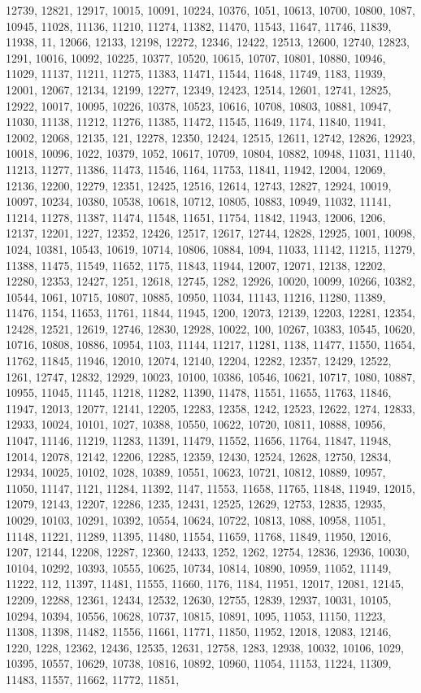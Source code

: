 \documentclass{article} \usepackage{hyperref}
\begin{document}
12739, 12821, 12917, 10015, 10091, 10224, 10376, 1051, 10613, 10700, 10800, 1087, 10945, 11028, 11136, 11210, 11274, 11382, 11470, 11543, 11647, 11746, 11839, 11938, 11, 12066, 12133, 12198, 12272, 12346, 12422, 12513, 12600, 12740, 12823, 1291, 10016, 10092, 10225, 10377, 10520, 10615, 10707, 10801, 10880, 10946, 11029, 11137, 11211, 11275, 11383, 11471, 11544, 11648, 11749, 1183, 11939, 12001, 12067, 12134, 12199, 12277, 12349, 12423, 12514, 12601, 12741, 12825, 12922, 10017, 10095, 10226, 10378, 10523, 10616, 10708, 10803, 10881, 10947, 11030, 11138, 11212, 11276, 11385, 11472, 11545, 11649, 1174, 11840, 11941, 12002, 12068, 12135, 121, 12278, 12350, 12424, 12515, 12611, 12742, 12826, 12923, 10018, 10096, 1022, 10379, 1052, 10617, 10709, 10804, 10882, 10948, 11031, 11140, 11213, 11277, 11386, 11473, 11546, 1164, 11753, 11841, 11942, 12004, 12069, 12136, 12200, 12279, 12351, 12425, 12516, 12614, 12743, 12827, 12924, 10019, 10097, 10234, 10380, 10538, 10618, 10712, 10805, 10883, 10949, 11032, 11141, 11214, 11278, 11387, 11474, 11548, 11651, 11754, 11842, 11943, 12006, 1206, 12137, 12201, 1227, 12352, 12426, 12517, 12617, 12744, 12828, 12925, 1001, 10098, 1024, 10381, 10543, 10619, 10714, 10806, 10884, 1094, 11033, 11142, 11215, 11279, 11388, 11475, 11549, 11652, 1175, 11843, 11944, 12007, 12071, 12138, 12202, 12280, 12353, 12427, 1251, 12618, 12745, 1282, 12926, 10020, 10099, 10266, 10382, 10544, 1061, 10715, 10807, 10885, 10950, 11034, 11143, 11216, 11280, 11389, 11476, 1154, 11653, 11761, 11844, 11945, 1200, 12073, 12139, 12203, 12281, 12354, 12428, 12521, 12619, 12746, 12830, 12928, 10022, 100, 10267, 10383, 10545, 10620, 10716, 10808, 10886, 10954, 1103, 11144, 11217, 11281, 1138, 11477, 11550, 11654, 11762, 11845, 11946, 12010, 12074, 12140, 12204, 12282, 12357, 12429, 12522, 1261, 12747, 12832, 12929, 10023, 10100, 10386, 10546, 10621, 10717, 1080, 10887, 10955, 11045, 11145, 11218, 11282, 11390, 11478, 11551, 11655, 11763, 11846, 11947, 12013, 12077, 12141, 12205, 12283, 12358, 1242, 12523, 12622, 1274, 12833, 12933, 10024, 10101, 1027, 10388, 10550, 10622, 10720, 10811, 10888, 10956, 11047, 11146, 11219, 11283, 11391, 11479, 11552, 11656, 11764, 11847, 11948, 12014, 12078, 12142, 12206, 12285, 12359, 12430, 12524, 12628, 12750, 12834, 12934, 10025, 10102, 1028, 10389, 10551, 10623, 10721, 10812, 10889, 10957, 11050, 11147, 1121, 11284, 11392, 1147, 11553, 11658, 11765, 11848, 11949, 12015, 12079, 12143, 12207, 12286, 1235, 12431, 12525, 12629, 12753, 12835, 12935, 10029, 10103, 10291, 10392, 10554, 10624, 10722, 10813, 1088, 10958, 11051, 11148, 11221, 11289, 11395, 11480, 11554, 11659, 11768, 11849, 11950, 12016, 1207, 12144, 12208, 12287, 12360, 12433, 1252, 1262, 12754, 12836, 12936, 10030, 10104, 10292, 10393, 10555, 10625, 10734, 10814, 10890, 10959, 11052, 11149, 11222, 112, 11397, 11481, 11555, 11660, 1176, 1184, 11951, 12017, 12081, 12145, 12209, 12288, 12361, 12434, 12532, 12630, 12755, 12839, 12937, 10031, 10105, 10294, 10394, 10556, 10628, 10737, 10815, 10891, 1095, 11053, 11150, 11223, 11308, 11398, 11482, 11556, 11661, 11771, 11850, 11952, 12018, 12083, 12146, 1220, 1228, 12362, 12436, 12535, 12631, 12758, 1283, 12938, 10032, 10106, 1029, 10395, 10557, 10629, 10738, 10816, 10892, 10960, 11054, 11153, 11224, 11309, 11483, 11557, 11662, 11772, 11851, 
\end{document}

